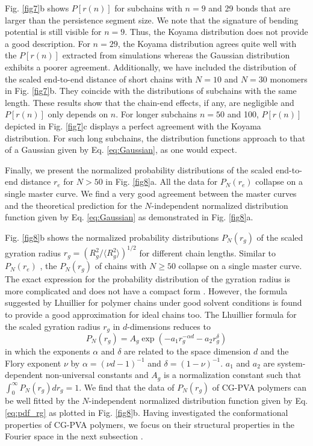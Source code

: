 \documentclass[pre,showpacs,notitlepage,twocolumn]{revtex4-1}
\begin{document}
Fig. \ref{fig7}b shows $P[r(n)]$ for  subchains with $n=9$ and 29 bonds that are larger than the persistence segment size. We note that the signature of bending potential is still visible for $n=9$. Thus, the Koyama distribution
does not provide a good description. For $n=29$, the Koyama distribution agrees quite well with the  $P[r(n)]$ extracted from simulations  whereas  the Gaussian distribution exhibits a poorer agreement. Additionally, we have included
the distribution of the scaled end-to-end distance of short chains with  $N=10$ and $N=30$ monomers in Fig. \ref{fig7}b. They coincide with the  distributions of subchains  with the same length. These results show that
the chain-end effects, if any, are negligible and $P[r(n)]$ only depends on $n$.
For longer subchains $n=50$ and 100, $P[r(n)]$ depicted in Fig. \ref{fig7}c  displays a perfect agreement with the Koyama distribution.  For such long subchains, the distribution functions approach to that of a Gaussian 
given by Eq. \eqref{eq:Gaussian}, as one would expect.
 
Finally, we present the normalized probability distributions of the scaled end-to-end distance $r_e$ for $N>50$ in Fig. \ref{fig8}a.
All the data   for   $P_N(r_e)$ collapse on a single master curve. We find a very good agreement between the master curves and the theoretical prediction for the $N$-independent normalized distribution function  given by Eq. \eqref{eq:Gaussian}  as demonstrated in Fig. \ref{fig8}a.


 Fig. \ref{fig8}b shows the  normalized probability distributions $P_N(r_g)$ of the scaled gyration radius $r_g= (R_g^2/ \langle R_g^2\rangle)^{1/2}$  for different chain lengths.
Similar to $P_N(r_e)$ , the $P_N(r_g)$ of chains with $N \ge 50$   collapse on a single master curve.
The exact expression for the probability distribution of the gyration radius  is more complicated and does not have a compact form \cite{pdfRg}. However,  the  formula suggested by Lhuillier \cite{Lhuillier} for polymer chains under good solvent conditions   is found to  provide  a good approximation for ideal chains   \cite{pdfRg1,Hsu2014,Kremer2016} too. The Lhuillier formula for the scaled 
gyration radius $r_g$  in $d$-dimensions reduces to
%
\begin{equation}
P_N(r_g)= A_g \exp \left( - a_1 r_g^{-\alpha d} -a_2 r_g^{\delta} \right)
\label{eq:pdf_rg}
\end{equation}
%
in which  the exponents $\alpha$ and $\delta$ are related to the space dimension $d$ and the Flory exponent $\nu$ by $\alpha=(\nu d-1)^{-1}$ and $\delta=(1-\nu)^{-1}$.  
$a_1$ and $a_2$ are system-dependent non-universal constants and $A_g$ is a normalization constant such that  $\int_{0}^{\infty} P_N(r_g) dr_g=1$.
We find that  the data of $P_N(r_g)$ of CG-PVA polymers can be well fitted by the $N$-independent normalized distribution function  given by  Eq. \eqref{eq:pdf_rg}  as
plotted  in Fig. \ref{fig8}b.   Having investigated the conformational properties of CG-PVA polymers,  we focus on their structural properties
in the Fourier space in the next subsection \cite{Vettorel2007,Meyer2010}.  
\end{document}
